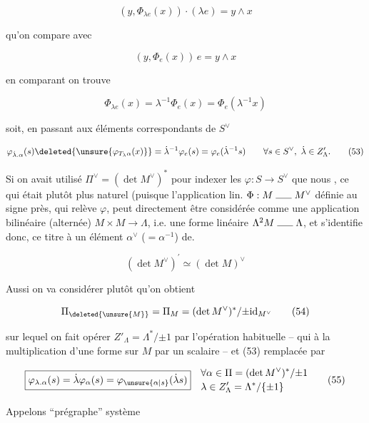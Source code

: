 \[
(y,\Phi_{\lambda e}(x))\cdot(\lambda e)=y\wedge x
\]

qu'on compare avec

\[
(y,\Phi_e(x))\,e=y\wedge x
\]

en comparant on trouve

\[
\Phi_{\lambda e}(x)=\lambda^{-1}\Phi_e(x)=\Phi_e(\lambda^{-1}x)
\]

soit, en passant aux éléments correspondants de $S^\vee$

\[
\varphi_{\dot\lambda.\alpha}(s)\deleted{\unsure{\varphi_{T_\lambda\alpha}(x)}}=
\dot\lambda^{-1}\varphi_e(s)=\varphi_e(\dot\lambda^{-1}s)
\qquad\forall s\in S^\vee,\ \dot\lambda\in Z'_\Lambda. \tag*{(53)}
\]


Si on avait utilisé $\Pi^\vee=(\det M^\vee)^*$ pour indexer les $\varphi:S\longrightarrow S^\vee$ que nous , ce qui était plutôt plus naturel (puisque l'application lin.  $\Phi:M\mathrel{\rule{1.6em}{0.35pt}}M^\vee$ définie au signe près, qui relève $\varphi$, peut  directement être considérée comme une application bilinéaire (alternée) $M\times M\longrightarrow\Lambda$, i.e. une forme linéaire $\Lambda^2M\mathrel{\rule{1.6em}{0.35pt}}\Lambda$, et s'identifie donc, ce titre à un élément $\alpha^\vee$ ($=\alpha^{-1}$) de.

\[
(\det M^\vee)^{\prime}\simeq(\det M)^\vee
\]

Aussi on va considérer plutôt qu'on obtient

\[
\Pi_{\deleted{\unsure{M}}}=\Pi_M=(\det M^\vee)^*/{\pm\mathrm{id}_{M^\vee}} \tag*{(54)}
\]

sur lequel on fait opérer \deleted{$\unsure{\Lambda}$} $Z'_\Lambda=\Lambda^*/{\pm1}$ par l'opération habituelle -- qui   à la multiplication d'une forme sur $M$ par un scalaire -- et (53)  remplacée par

\[
\boxed{\varphi_{\lambda.\alpha}(s)=\dot\lambda\varphi_\alpha(s)=\varphi_{\unsure{\alpha|s}}(\dot\lambda s)}
\quad\begin{aligned}
&\forall\alpha\in\Pi=(\det M^\vee)^*/{\pm1}\\[-1pt]
&\lambda\in Z'_\Lambda=\Lambda^*/\{\pm1\}
\end{aligned} \tag*{(55)}
\]

 Appelons ``prégraphe''  système

